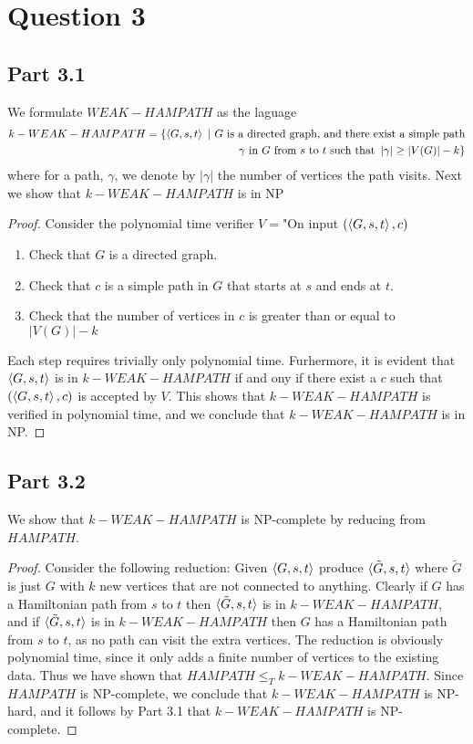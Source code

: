 \documentclass[a4paper,11pt]{article}
\newcommand{\abs}[1]{\left\lvert #1 \right\rvert}
\newcommand{\pipe}{\ \vert \ }
\numberwithin{equation}{section}
\begin{document}
	
	\section*{Question 3}
	\subsection*{Part 3.1}
	We formulate $ WEAK-HAMPATH $ as the laguage\begin{equation*}
	\begin{aligned}
		k-WEAK-HAMPATH=\{\braket{G,s,t}\pipe G\text{ is a directed graph, and there exist a simple path}\\\text{$ \gamma $ in $ G $ from $ s $ to $ t $ such that }\abs{\gamma}\geq\abs{V(G)}-k\}
	\end{aligned}
	\end{equation*}
	where for a path, $ \gamma $, we denote by $ \abs{\gamma} $ the number of vertices the path visits. Next we show that $ k-WEAK-HAMPATH $ is in NP\begin{proof}
		Consider the polynomial time verifier $ V= $"On input $ (\braket{G,s,t},c) $\begin{enumerate}
			\item Check that $ G $ is a directed graph.
			\item Check that $ c $ is a simple path in $ G $ that starts at $ s $ and ends at $ t $.
			\item Check that the number of vertices in $ c $ is greater than or equal to $ \abs{V(G)}-k $
		\end{enumerate}
		Each step requires trivially only polynomial time. Furhermore, it is evident that $ \braket{G,s,t} $ is in $ k-WEAK-HAMPATH $ if and ony if there exist a $ c $ such that $ (\braket{G,s,t},c) $ is accepted by $ V $. This shows that $ k-WEAK-HAMPATH $ is verified in polynomial time, and we conclude that $ k-WEAK-HAMPATH $ is in NP.
	\end{proof}
	
	\subsection*{Part 3.2}
	We show that $ k-WEAK-HAMPATH $ is NP-complete by reducing from $ HAMPATH $.
	\begin{proof}
		Consider the following reduction: Given $ \braket{G,s,t} $ produce $ \braket{\tilde{G},s,t} $ where $ \tilde{G} $ is just $ G $ with $ k $ new vertices that are not connected to anything. Clearly if $ G $ has a Hamiltonian path from $ s $ to $ t $ then $ \braket{\tilde{G},s,t} $ is in $ k-WEAK-HAMPATH $, and if $ \braket{\tilde{G},s,t} $ is in $ k-WEAK-HAMPATH $ then $ G $ has a Hamiltonian path from $ s $ to $ t $, as no path can visit the extra vertices. The reduction is obviously polynomial time, since it only adds a finite number of vertices to the existing data. Thus we have shown that $ HAMPATH\leq_T k-WEAK-HAMPATH $. Since $ HAMPATH $ is NP-complete, we conclude that $ k-WEAK-HAMPATH $ is NP-hard, and it follows by Part 3.1 that $ k-WEAK-HAMPATH $ is NP-complete.
	\end{proof}
\end{document}
